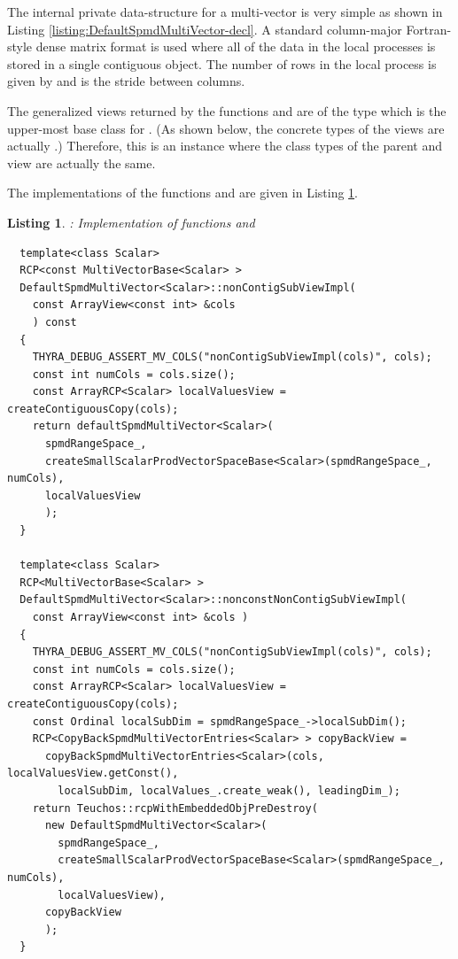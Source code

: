 \documentclass[pdf,ps2pdf,11pt]{SANDreport}
\newtheorem{listing}{Listing}
\begin{document}
The internal private data-structure for a multi-vector is very simple
as shown in Listing {}\ref{listing:DefaultSpmdMultiVector-decl}.  A
standard column-major Fortran-style dense matrix format is used where
all of the data in the local processes is stored in a single
contiguous {} object.  The number of rows in the
local process is given by {} and
{} is the stride between columns.

The generalized views returned by the functions
{} and
{} are of the type
{} which is the upper-most base class for
{}.  (As shown below, the concrete types
of the views are actually {}.) Therefore,
this is an instance where the class types of the parent and view are
actually the same.

The implementations of the functions {} 
and {} are given in Listing
{}\ref{listing:DefaultSpmdMultiVector-subivew-impl}.


{}\begin{listing}: Implementation of {}
functions {} and
{} \\
\label{listing:DefaultSpmdMultiVector-subivew-impl}
{\small\begin{verbatim}
  template<class Scalar>
  RCP<const MultiVectorBase<Scalar> >
  DefaultSpmdMultiVector<Scalar>::nonContigSubViewImpl(
    const ArrayView<const int> &cols
    ) const
  {
    THYRA_DEBUG_ASSERT_MV_COLS("nonContigSubViewImpl(cols)", cols);
    const int numCols = cols.size();
    const ArrayRCP<Scalar> localValuesView = createContiguousCopy(cols);
    return defaultSpmdMultiVector<Scalar>(
      spmdRangeSpace_,
      createSmallScalarProdVectorSpaceBase<Scalar>(spmdRangeSpace_, numCols),
      localValuesView
      );
  }
  
  template<class Scalar>
  RCP<MultiVectorBase<Scalar> >
  DefaultSpmdMultiVector<Scalar>::nonconstNonContigSubViewImpl(
    const ArrayView<const int> &cols )
  {
    THYRA_DEBUG_ASSERT_MV_COLS("nonContigSubViewImpl(cols)", cols);
    const int numCols = cols.size();
    const ArrayRCP<Scalar> localValuesView = createContiguousCopy(cols);
    const Ordinal localSubDim = spmdRangeSpace_->localSubDim();
    RCP<CopyBackSpmdMultiVectorEntries<Scalar> > copyBackView =
      copyBackSpmdMultiVectorEntries<Scalar>(cols, localValuesView.getConst(),
        localSubDim, localValues_.create_weak(), leadingDim_);
    return Teuchos::rcpWithEmbeddedObjPreDestroy(
      new DefaultSpmdMultiVector<Scalar>(
        spmdRangeSpace_,
        createSmallScalarProdVectorSpaceBase<Scalar>(spmdRangeSpace_, numCols),
        localValuesView),
      copyBackView
      );
  }
\end{verbatim}}
\end{listing}
\end{document}
